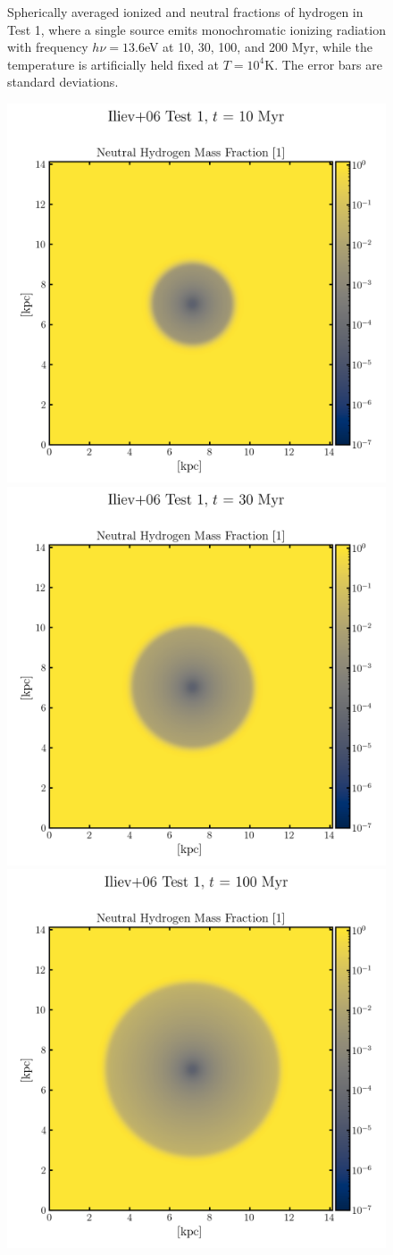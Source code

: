 \begin{figure}
 \caption{
Spherically averaged ionized and neutral fractions of hydrogen in Test 1, where a single source
emits monochromatic ionizing radiation with frequency $h \nu = 13.6$eV at 10, 30, 100, and 200 Myr,
while the temperature is artificially held fixed at $T = 10^4$K. The error bars are standard
deviations.
 }
 \label{fig:iliev1}
\end{figure}


\begin{figure}
 \centering
 \includegraphics[width=.49\textwidth]{figures/RHD/Iliev1/output_0001-NoRef.png}%
 \includegraphics[width=.49\textwidth]{figures/RHD/Iliev1/output_0003-NoRef.png}\\%
 \includegraphics[width=.49\textwidth]{figures/RHD/Iliev1/output_0010-NoRef.png}%

\end{figure}
